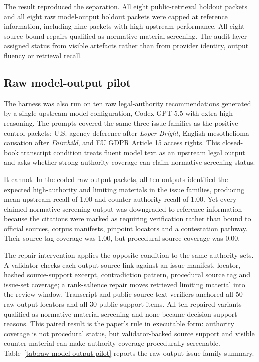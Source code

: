 \documentclass[12pt,a4paper]{article}
\begin{document}
The result reproduced the separation. All eight public-retrieval holdout packets and all eight raw model-output holdout packets were capped at reference information, including nine packets with high upstream performance. All eight source-bound repairs qualified as normative material screening. The audit layer assigned status from visible artefacts rather than from provider identity, output fluency or retrieval recall.

\subsection{Raw model-output pilot}

The harness was also run on ten raw legal-authority recommendations generated by a single upstream model configuration, Codex GPT-5.5 with extra-high reasoning. The prompts covered the same three issue families as the positive-control packets: U.S. agency deference after \textit{Loper Bright}, English mesothelioma causation after \textit{Fairchild}, and EU GDPR Article 15 access rights. This closed-book transcript condition treats fluent model text as an upstream legal output and asks whether strong authority coverage can claim normative screening status.

It cannot. In the coded raw-output packets, all ten outputs identified the expected high-authority and limiting materials in the issue families, producing mean upstream recall of 1.00 and counter-authority recall of 1.00. Yet every claimed normative-screening output was downgraded to reference information because the citations were marked as requiring verification rather than bound to official sources, corpus manifests, pinpoint locators and a contestation pathway. Their source-tag coverage was 1.00, but procedural-source coverage was 0.00.

The repair intervention applies the opposite condition to the same authority sets. A validator checks each output-source link against an issue manifest, locator, hashed source-support excerpt, contradiction pattern, procedural source tag and issue-set coverage; a rank-salience repair moves retrieved limiting material into the review window. Transcript and public source-text verifiers anchored all 50 raw-output locators and all 30 public support items. All ten repaired variants qualified as normative material screening and none became decision-support reasons. This paired result is the paper's rule in executable form: authority coverage is not procedural status, but validator-backed source support and visible counter-material can make authority coverage procedurally screenable. Table~\ref{tab:raw-model-output-pilot} reports the raw-output issue-family summary.
\end{document}
